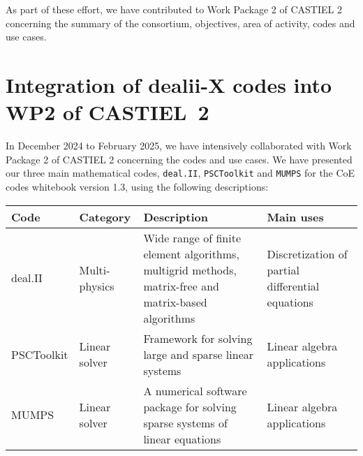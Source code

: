 \documentclass[a4paper,12pt]{article}
\begin{document}
As part of these effort, we have contributed to Work Package 2 of CASTIEL 2
concerning the summary of the consortium, objectives, area of activity, codes
and use cases.

\section{Integration of dealii-X codes into WP2 of CASTIEL~2}

In December 2024 to February 2025, we have intensively collaborated with Work
Package 2 of CASTIEL 2 concerning the codes and use cases. We have presented
our three main mathematical codes, \texttt{deal.II}, \texttt{PSCToolkit} and
\texttt{MUMPS} for the CoE codes whitebook version 1.3, using the following
descriptions:


{\small
  \noindent
  \renewcommand{\arraystretch}{2.5}
\begin{tabular}{llll}
  \hline
  \textbf{Code} & \textbf{Category} & \textbf{Description} & \textbf{Main uses} \\
  \hline
  deal.II & \begin{minipage}{0.1\textwidth}Multi-physics\end{minipage} & \begin{minipage}{0.4\textwidth}
    Wide range of finite element algorithms, multigrid methods, matrix-free and matrix-based algorithms
  \end{minipage}
                                & \begin{minipage}{0.26\textwidth}Discretization of partial differential equations\end{minipage}
  \\
  PSCToolkit & \begin{minipage}{0.1\textwidth}Linear solver\end{minipage} &\begin{minipage}{0.4\textwidth}
  Framework for solving large and sparse linear systems
  \end{minipage}
                                & \begin{minipage}{0.26\textwidth}Linear algebra applications\end{minipage}
  \\
  MUMPS & \begin{minipage}{0.1\textwidth}Linear solver\end{minipage} &\begin{minipage}{0.4\textwidth}
  A numerical software package for solving sparse systems of linear equations
  \end{minipage}
                                                           & \begin{minipage}{0.26\textwidth}Linear algebra applications\end{minipage}
  \\
  \hline
\end{tabular}
}
\end{document}
